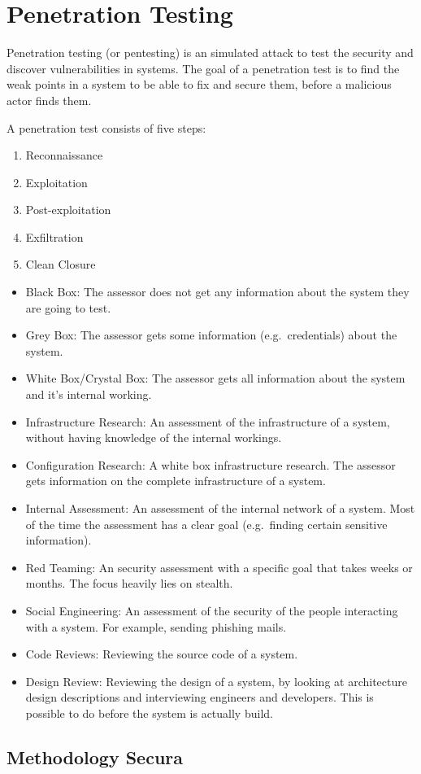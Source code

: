\section{Penetration Testing}
Penetration testing (or pentesting) is an simulated attack to test the security and discover vulnerabilities in systems. The goal of a penetration test is to find the weak points in a system to be able to fix and secure them, before a malicious actor finds them.

\hfill

A penetration test consists of five steps:
\begin{enumerate}
    \item Reconnaissance
    \item Exploitation
    \item Post-exploitation
    \item Exfiltration
    \item Clean Closure
\end{enumerate}

\begin{itemize}
    \item Black Box: The assessor does not get any information about the system they are going to test.  
    \item Grey Box: The assessor gets some information (e.g.\ credentials) about the system.
    \item White Box/Crystal Box:  The assessor gets all information about the system and it's internal working.
    \item Infrastructure Research: An assessment of the infrastructure of a system, without having knowledge of the internal workings.
    \item Configuration Research: A white box infrastructure research. The assessor gets information on the complete infrastructure of a system.
    \item Internal Assessment: An assessment of the internal network of a system. Most of the time the assessment has a clear goal (e.g.\ finding certain sensitive information).
    \item Red Teaming: An security assessment with a specific goal that takes weeks or months. The focus heavily lies on stealth.
    \item Social Engineering: An assessment of the security of the people interacting with a system. For example, sending phishing mails.
    \item Code Reviews: Reviewing the source code of a system.
    \item Design Review: Reviewing the design of a system, by looking at architecture design descriptions and interviewing engineers and developers. This is possible to do before the system is actually build.
\end{itemize}

\subsection{Methodology Secura}
